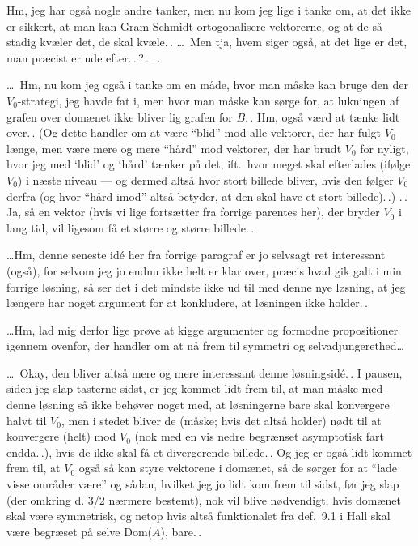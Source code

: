 \documentclass{report}
\begin{document}
Hm, jeg har også nogle andre tanker, men nu kom jeg lige i tanke om, at det ikke er sikkert, at man kan Gram-Schmidt-ortogonalisere vektorerne, og at de så stadig kvæler det, de skal kvæle.\,. \ldots\ Men tja, hvem siger også, at det lige er det, man præcist er ude efter.\,.\,?\,. .\,. 

\ldots\ Hm, nu kom jeg også i tanke om en måde, hvor man måske kan bruge den der $V_0$-strategi, jeg havde fat i, men hvor man måske kan sørge for, at lukningen af grafen over domænet ikke bliver lig grafen for $B$.\,. Hm, også værd at tænke lidt over.\,. (Og dette handler om at være ``blid'' mod alle vektorer, der har fulgt $V_0$ længe, men være mere og mere ``hård'' mod vektorer, der har brudt $V_0$ for nyligt, hvor jeg med `blid' og `hård' tænker på det, ift.\ hvor meget skal efterlades (ifølge $V_0$) i næste niveau --- og dermed altså hvor stort billede bliver, hvis den følger $V_0$ derfra (og hvor ``hård imod'' altså betyder, at den skal have et stort billede).\,.) .\,.\,Ja, så en vektor (hvis vi lige fortsætter fra forrige parentes her), der bryder $V_0$ i lang tid, vil ligesom få et større og større billede.\,. 

\ldots Hm, denne seneste idé her fra forrige paragraf er jo selvsagt ret interessant (også), for selvom jeg jo endnu ikke helt er klar over, præcis hvad gik galt i min forrige løsning, så ser det i det mindste ikke ud til med denne nye løsning, at jeg længere har noget argument for at konkludere, at løsningen ikke holder.\,. 

\ldots Hm, lad mig derfor lige prøve at kigge argumenter og formodne propositioner igennem ovenfor, der handler om at nå frem til symmetri og selvadjungerethed\ldots 

\ldots\ Okay, den bliver altså mere og mere interessant denne løsningsidé.\,. I pausen, siden jeg slap tasterne sidst, er jeg kommet lidt frem til, at man måske med denne løsning så ikke behøver noget med, at løsningerne bare skal konvergere halvt til $V_0$, men i stedet bliver de (måske; hvis det altså holder) nødt til at konvergere (helt) mod $V_0$ (nok med en vis nedre begrænset asymptotisk fart endda.\,.), hvis de ikke skal få et divergerende billede.\,. Og jeg er også lidt kommet frem til, at $V_0$ også så kan styre vektorene i domænet, så de sørger for at ``lade visse områder være'' og sådan, hvilket jeg jo lidt kom frem til sidst, før jeg slap (der omkring d. 3/2 nærmere bestemt), nok vil blive nødvendigt, hvis domænet skal være symmetrisk, og netop hvis altså funktionalet fra def.\ 9.1 i Hall skal være begræset på selve Dom($A$), bare.\,. 
\end{document}
